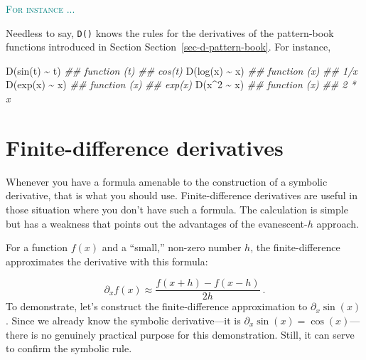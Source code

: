 \documentclass[
  letterpaper,
  DIV=11,
  numbers=noendperiod,
  oneside]{scrreprt}
\newenvironment{Shaded}{\begin{snugshade}}{\end{snugshade}}
\newcommand{\DecValTok}[1]{\textcolor[rgb]{0.68,0.00,0.00}{#1}}
\newcommand{\DocumentationTok}[1]{\textcolor[rgb]{0.37,0.37,0.37}{\textit{#1}}}
\newcommand{\FunctionTok}[1]{\textcolor[rgb]{0.28,0.35,0.67}{#1}}
\newcommand{\NormalTok}[1]{\textcolor[rgb]{0.00,0.46,0.62}{#1}}
\newcommand{\SpecialCharTok}[1]{\textcolor[rgb]{0.37,0.37,0.37}{#1}}
\newenvironment{example}%
{%
\textcolor{teal}{\hrulefill}%
  \par\vspace{.3\baselineskip}%
  \textcolor{teal}{\scshape For instance ...}%
  \par\vspace{\baselineskip}%
}%
{\textcolor{teal}{\hrulefill}}
\begin{document}
\begin{example}

Needless to say, \texttt{D()} knows the rules for the derivatives of the
pattern-book functions introduced in Section
Section~\ref{sec-d-pattern-book}. For instance,

\begin{Shaded}
\begin{Highlighting}[]
\FunctionTok{D}\NormalTok{(}\FunctionTok{sin}\NormalTok{(t) }\SpecialCharTok{\textasciitilde{}}\NormalTok{ t)}
\DocumentationTok{\#\# function (t) }
\DocumentationTok{\#\# cos(t)}
\FunctionTok{D}\NormalTok{(}\FunctionTok{log}\NormalTok{(x) }\SpecialCharTok{\textasciitilde{}}\NormalTok{ x)}
\DocumentationTok{\#\# function (x) }
\DocumentationTok{\#\# 1/x}
\FunctionTok{D}\NormalTok{(}\FunctionTok{exp}\NormalTok{(x) }\SpecialCharTok{\textasciitilde{}}\NormalTok{ x)}
\DocumentationTok{\#\# function (x) }
\DocumentationTok{\#\# exp(x)}
\FunctionTok{D}\NormalTok{(x}\SpecialCharTok{\^{}}\DecValTok{2} \SpecialCharTok{\textasciitilde{}}\NormalTok{ x)}
\DocumentationTok{\#\# function (x) }
\DocumentationTok{\#\# 2 * x}
\end{Highlighting}
\end{Shaded}

\end{example}

\hypertarget{finite-difference-derivatives}{%
\section{Finite-difference
derivatives}\label{finite-difference-derivatives}}

Whenever you have a formula amenable to the construction of a symbolic
derivative, that is what you should use. Finite-difference derivatives
are useful in those situation where you don't have such a formula. The
calculation is simple but has a weakness that points out the advantages
of the evanescent-\(h\) approach.

For a function \(f(x)\) and a ``small,'' non-zero number \(h\), the
finite-difference approximates the derivative with this formula:

\[\partial_x f(x) \approx \frac{f(x+h) - f(x-h)}{2h}\ .\] To
demonstrate, let's construct the finite-difference approximation to
\(\partial_x \sin(x)\). Since we already know the symbolic
derivative---it is \(\partial_x \sin(x) = \cos(x)\)---there is no
genuinely practical purpose for this demonstration. Still, it can serve
to confirm the symbolic rule.
\end{document}

